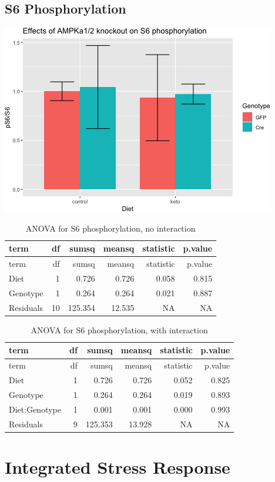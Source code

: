 \documentclass[]{article}
\begin{document}
\hypertarget{s6-phosphorylation}{%
\subsection{S6 Phosphorylation}\label{s6-phosphorylation}}

\includegraphics{figures/pS6-barplot-1.png}

\begin{longtable}[]{@{}lrrrrr@{}}
\caption{ANOVA for S6 phosphorylation, no interaction}\tabularnewline
\toprule
term & df & sumsq & meansq & statistic & p.value\tabularnewline
\midrule
\endfirsthead
\toprule
term & df & sumsq & meansq & statistic & p.value\tabularnewline
\midrule
\endhead
Diet & 1 & 0.726 & 0.726 & 0.058 & 0.815\tabularnewline
Genotype & 1 & 0.264 & 0.264 & 0.021 & 0.887\tabularnewline
Residuals & 10 & 125.354 & 12.535 & NA & NA\tabularnewline
\bottomrule
\end{longtable}

\begin{longtable}[]{@{}lrrrrr@{}}
\caption{ANOVA for S6 phosphorylation, with interaction}\tabularnewline
\toprule
term & df & sumsq & meansq & statistic & p.value\tabularnewline
\midrule
\endfirsthead
\toprule
term & df & sumsq & meansq & statistic & p.value\tabularnewline
\midrule
\endhead
Diet & 1 & 0.726 & 0.726 & 0.052 & 0.825\tabularnewline
Genotype & 1 & 0.264 & 0.264 & 0.019 & 0.893\tabularnewline
Diet:Genotype & 1 & 0.001 & 0.001 & 0.000 & 0.993\tabularnewline
Residuals & 9 & 125.353 & 13.928 & NA & NA\tabularnewline
\bottomrule
\end{longtable}

\hypertarget{integrated-stress-response}{%
\section{Integrated Stress Response}\label{integrated-stress-response}}
\end{document}
